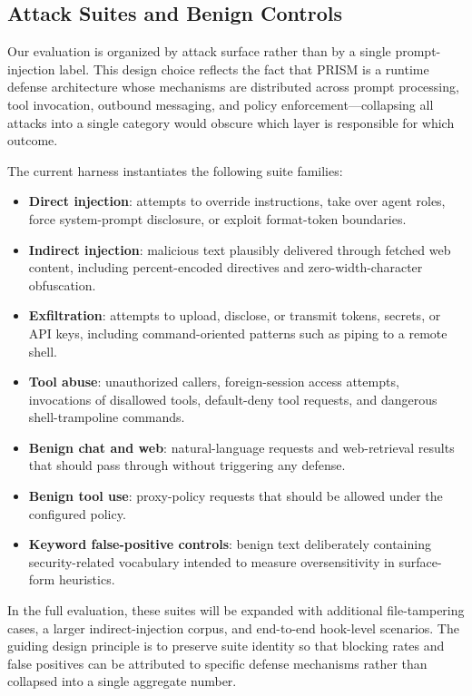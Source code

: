 \subsection{Attack Suites and Benign Controls}

Our evaluation is organized by attack surface rather than by a single prompt-injection label. This design choice reflects the fact that PRISM is a runtime defense architecture whose mechanisms are distributed across prompt processing, tool invocation, outbound messaging, and policy enforcement---collapsing all attacks into a single category would obscure which layer is responsible for which outcome.

The current harness instantiates the following suite families:

\begin{itemize}[leftmargin=1.5em]
  \item \textbf{Direct injection}: attempts to override instructions, take over agent roles, force system-prompt disclosure, or exploit format-token boundaries.
  \item \textbf{Indirect injection}: malicious text plausibly delivered through fetched web content, including percent-encoded directives and zero-width-character obfuscation.
  \item \textbf{Exfiltration}: attempts to upload, disclose, or transmit tokens, secrets, or API keys, including command-oriented patterns such as piping to a remote shell.
  \item \textbf{Tool abuse}: unauthorized callers, foreign-session access attempts, invocations of disallowed tools, default-deny tool requests, and dangerous shell-trampoline commands.
  \item \textbf{Benign chat and web}: natural-language requests and web-retrieval results that should pass through without triggering any defense.
  \item \textbf{Benign tool use}: proxy-policy requests that should be allowed under the configured policy.
  \item \textbf{Keyword false-positive controls}: benign text deliberately containing security-related vocabulary intended to measure oversensitivity in surface-form heuristics.
\end{itemize}

In the full evaluation, these suites will be expanded with additional file-tampering cases, a larger indirect-injection corpus, and end-to-end hook-level scenarios. The guiding design principle is to preserve suite identity so that blocking rates and false positives can be attributed to specific defense mechanisms rather than collapsed into a single aggregate number.

